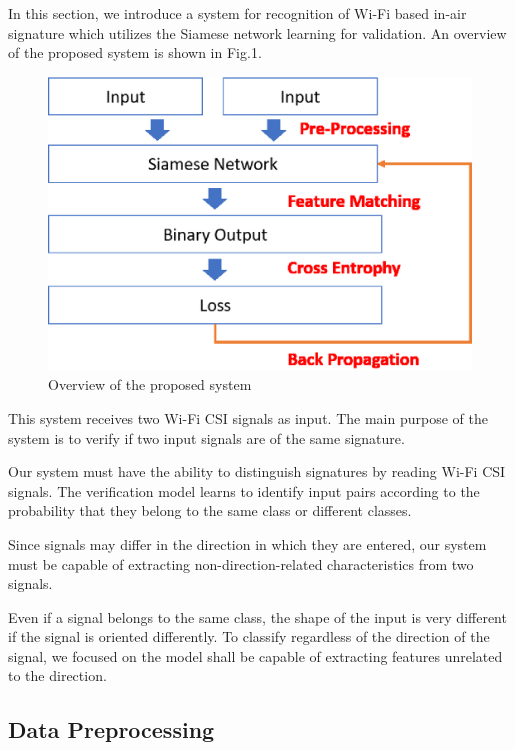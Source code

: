 \documentclass[runningheads]{llncs}
\begin{document}

In this section, we introduce a system for recognition of Wi-Fi based in-air signature which utilizes the Siamese network learning for validation.
An overview of the proposed system is shown in Fig.1.
\begin{figure}
    \includegraphics[width=\textwidth]{methods1.eps}
    \caption{Overview of the proposed system} \label{method1}
\end{figure}

This system receives two Wi-Fi CSI signals as input.
The main purpose of the system is to verify if two input signals are of the same signature.

Our system must have the ability to distinguish signatures by reading Wi-Fi CSI signals.
The verification model learns to identify input pairs according to the probability that they belong to the same class or different classes.\cite{koch2015siamese}

Since signals may differ in the direction in which they are entered, our system must be capable of extracting non-direction-related characteristics from two signals.

Even if a signal belongs to the same class, the shape of the input is very different if the signal is oriented differently.
To classify regardless of the direction of the signal, we focused on the model shall be capable of extracting features unrelated to the direction.

\subsection{Data Preprocessing}
\end{document}
